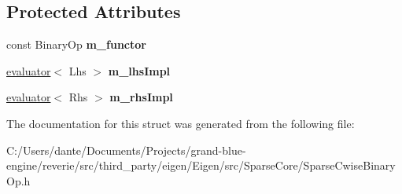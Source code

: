 \subsection*{Protected Attributes}
\begin{DoxyCompactItemize}
\item 
\mbox{\label{struct_eigen_1_1internal_1_1binary__evaluator_3_01_cwise_binary_op_3_01_binary_op_00_01_lhs_00_05c4f9212bd4fb2e2b8664dee5123f03b_a25ce5e8eb8ee596b2c0f3b6b43179c70}} 
const Binary\+Op {\bfseries m\+\_\+functor}
\item 
\mbox{\label{struct_eigen_1_1internal_1_1binary__evaluator_3_01_cwise_binary_op_3_01_binary_op_00_01_lhs_00_05c4f9212bd4fb2e2b8664dee5123f03b_ac9d9bb135cf00c16bb4efea3977a6dbe}} 
\mbox{\hyperlink{struct_eigen_1_1internal_1_1evaluator}{evaluator}}$<$ Lhs $>$ {\bfseries m\+\_\+lhs\+Impl}
\item 
\mbox{\label{struct_eigen_1_1internal_1_1binary__evaluator_3_01_cwise_binary_op_3_01_binary_op_00_01_lhs_00_05c4f9212bd4fb2e2b8664dee5123f03b_a96a2e714753042bdd908cb1e21899d7f}} 
\mbox{\hyperlink{struct_eigen_1_1internal_1_1evaluator}{evaluator}}$<$ Rhs $>$ {\bfseries m\+\_\+rhs\+Impl}
\end{DoxyCompactItemize}


The documentation for this struct was generated from the following file\+:\begin{DoxyCompactItemize}
\item 
C\+:/\+Users/dante/\+Documents/\+Projects/grand-\/blue-\/engine/reverie/src/third\+\_\+party/eigen/\+Eigen/src/\+Sparse\+Core/Sparse\+Cwise\+Binary\+Op.\+h\end{DoxyCompactItemize}

